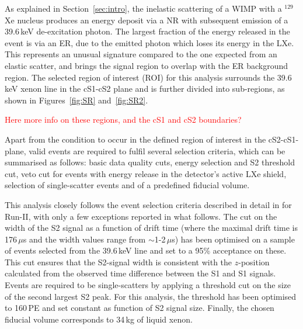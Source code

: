 As explained in Section~\ref{sec:intro}, the inelastic scattering of a WIMP with a $^{129}$Xe nucleus produces an energy deposit via a NR with subsequent emission of  
a 39.6\,keV de-excitation photon. The largest fraction of the energy released in the event is via an ER, due to the emitted photon which loses its energy in the LXe.
This represents an unusual signature compared to the one expected from an elastic scatter, and brings the signal region to overlap with the ER background region.
The selected region of interest (ROI) for this analysis surrounds the 39.6\,keV xenon line in the cS1-cS2 plane and is further divided into
sub-regions, as shown in Figures~\ref{fig:SR} and~\ref{fig:SR2}. {\textcolor{red} {Here more info on these regions, and the cS1 and cS2 boundaries?}

Apart from the condition to occur in the defined region of interest in the cS2-cS1-plane, valid events are required to fulfil several selection criteria, 
which can be summarised as follows: basic data quality cuts, energy selection and S2 threshold cut, veto cut for events with energy release in the detector's active LXe shield, 
selection of single-scatter events and of a predefined fiducial volume. 

This analysis closely follows the event selection criteria described in detail in \cite{Aprile:2012vw} for Run-II, with only a few exceptions reported in what follows. 
The cut on the width of the S2 signal as a function of drift time (where the maximal drift time is 176\,$\mu$s and the width values range from $\sim$1-2\,$\mu$s) has been optimised on a sample of events selected from the 39.6\,keV line and set to a 95\% acceptance on these. This cut ensures that the S2-signal width is consistent with the $z$-position calculated from the observed time difference between the S1 and S1 signals. Events are required to be single-scatters by applying a threshold cut on the size of the 
second largest S2 peak. For this analysis, the threshold has been optimised to 160\,PE and set constant as function of S2 signal size. 
Finally, the chosen fiducial volume corresponds to 34\,kg of liquid xenon.


}
